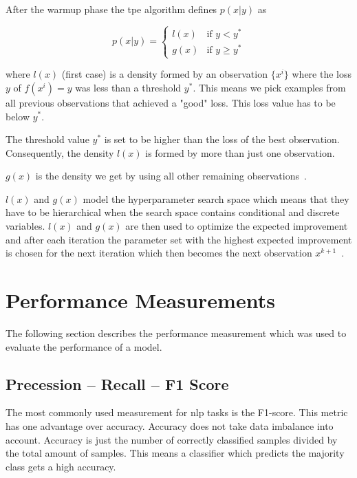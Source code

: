 After the warmup phase the \gls{tpe} algorithm defines $p(x|y)$ as

\begin{equation}
p(x|y) =
\begin{cases}

l(x) & \text{if } y < y^* \\
g(x) & \text{if } y \geq y^*

\end{cases}
\end{equation}

where $l(x)$ {(first case)} is a density formed by an observation $\{x^i\}$ where the loss $y$ of $f(x^i)=y$ was less than a threshold $y^*$. This means we pick examples from all previous observations that achieved a "good" loss. This loss value has to be below $y^*$.
\medskip

The threshold value $y^*$ is set to be higher than the loss of the best observation. Consequently, the density $l(x)$ is formed by more than just one observation. 
\smallskip

$g(x)$ is the density we get by using all other remaining observations~\cite{Bergstra2013a}. 
\medskip



$l(x)$ and $g(x)$ model the hyperparameter search space which means that they have to be hierarchical when the search space contains conditional and discrete variables. $l(x)$ and $g(x)$ are then used to optimize the expected improvement and after each iteration the parameter set with the highest expected improvement is chosen for the next iteration which then becomes the next observation $x^{k+1}$~\cite{Bergstra2013a}. 

\section{Performance Measurements}
The following section describes the performance measurement which was used to evaluate the performance of a model.


\subsection{Precession -- Recall -- F1 Score}
The most commonly used measurement for \gls{nlp} tasks is the F1-score. This metric has one advantage over accuracy. Accuracy does not take data imbalance into account. Accuracy is just the number of correctly classified samples divided by the total amount of samples. This means a classifier which predicts the majority class gets a high accuracy.
\medskip

